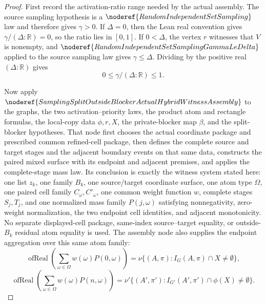 \begin{proof}
First record the activation-ratio range needed by the actual assembly.  The
source sampling hypothesis is a \(\noderef{RandomIndependentSetSampling}\) law
and therefore gives \(\gamma>0\).  If \(\Delta=0\), then the Lean real
convention gives \(\gamma/(\Delta:\mathbb R)=0\), so the ratio lies in
\([0,1]\).  If \(0<\Delta\), the vertex \(r\) witnesses that \(V\) is
nonempty, and
\(\noderef{RandomIndependentSetSamplingGammaLeDelta}\) applied to the source
sampling law gives \(\gamma\le\Delta\).  Dividing by the positive real
\((\Delta:\mathbb R)\) gives
\[
  0\le \gamma/(\Delta:\mathbb R)\le 1 .
\]

Now apply
\(\noderef{SamplingSplitOutsideBlockerActualHybridWitnessAssembly}\) to the
graphs, the two activation--priority laws, the product atom and rectangle
formulas, the local-copy data \(\phi,r,X\), the private-blocker map \(\beta\),
and the split-blocker hypotheses.  That node first chooses the actual
coordinate package and prescribed common refined-cell package, then defines
the complete source and target stages and the adjacent boundary events on
that same data, constructs the paired mixed surface with its endpoint and
adjacent premises, and applies the complete-stage mass law.  Its conclusion
is exactly the witness system stated here: one list \(z_k\), one family
\(B_k\), one source/target coordinate
surface, one atom type \(\Omega\), one paired cell family
\(C_\omega,C'_\omega\), one common weight function \(w\), complete stages
\(S_j,T_j\), and one normalized mass family \(P(j,\omega)\) satisfying
nonnegativity, zero-weight normalization, the two endpoint cell identities,
and adjacent monotonicity.  No separate displayed-cell package, same-index
source--target equality, or outside-\(B_k\) residual atom equality is used.
The assembly node also supplies the endpoint aggregation over this same atom
family:
\[
  \operatorname{ofReal}\!\left(\sum_{\omega\in\Omega}w(\omega)P(0,\omega)\right)
  =
  \nu\{(A,\pi):I_G(A,\pi)\cap X\ne\emptyset\},
\]
\[
  \operatorname{ofReal}\!\left(\sum_{\omega\in\Omega}w(\omega)P(n,\omega)\right)
  =
  \nu'\{(A',\pi'):I_{G'}(A',\pi')\cap\phi(X)\ne\emptyset\}.
\]
\end{proof}

